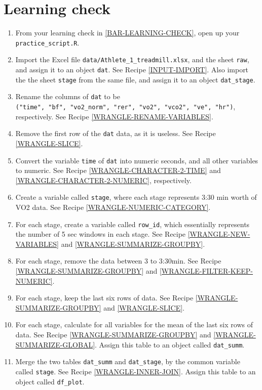 \documentclass[
]{book}
\begin{document}
\hypertarget{LINE-GRAPH-LEARNING-CHECK}{%
\section{Learning check}\label{LINE-GRAPH-LEARNING-CHECK}}

\begin{enumerate}
\def\labelenumi{\arabic{enumi}.}
\item
  From your learning check in \ref{BAR-LEARNING-CHECK}, open up your \texttt{practice\_script.R}.
\item
  Import the Excel file \texttt{data/Athlete\_1\_treadmill.xlsx}, and the sheet \texttt{raw}, and assign it to an object \texttt{dat}. See Recipe \ref{INPUT-IMPORT}. Also import the the sheet \texttt{stage} from the same file, and assign it to an object \texttt{dat\_stage}.
\item
  Rename the columns of \texttt{dat} to be \texttt{("time",\ "bf",\ "vo2\_norm",\ "rer",\ "vo2",\ "vco2",\ "ve",\ "hr")}, respectively. See Recipe \ref{WRANGLE-RENAME-VARIABLES}.
\item
  Remove the first row of the \texttt{dat} data, as it is useless. See Recipe \ref{WRANGLE-SLICE}.
\item
  Convert the variable \texttt{time} of \texttt{dat} into numeric seconds, and all other variables to numeric. See Recipe \ref{WRANGLE-CHARACTER-2-TIME} and \ref{WRANGLE-CHARACTER-2-NUMERIC}, respectively.
\item
  Create a variable called \texttt{stage}, where each stage represents 3:30 min worth of VO2 data. See Recipe \ref{WRANGLE-NUMERIC-CATEGORY}.
\item
  For each stage, create a variable called \texttt{row\_id}, which essentially represents the number of 5 sec windows in each stage. See Recipe \ref{WRANGLE-NEW-VARIABLES} and \ref{WRANGLE-SUMMARIZE-GROUPBY}.
\item
  For each stage, remove the data between 3 to 3:30min. See Recipe \ref{WRANGLE-SUMMARIZE-GROUPBY} and \ref{WRANGLE-FILTER-KEEP-NUMERIC}.
\item
  For each stage, keep the last six rows of data. See Recipe \ref{WRANGLE-SUMMARIZE-GROUPBY} and \ref{WRANGLE-SLICE}.
\item
  For each stage, calculate for all variables for the mean of the last six rows of data. See Recipe \ref{WRANGLE-SUMMARIZE-GROUPBY} and \ref{WRANGLE-SUMMARIZE-GLOBAL}. Assign this table to an object called \texttt{dat\_summ}.
\item
  Merge the two tables \texttt{dat\_summ} and \texttt{dat\_stage}, by the common variable called \texttt{stage}. See Recipe \ref{WRANGLE-INNER-JOIN}. Assign this table to an object called \texttt{df\_plot}.

\end{enumerate}
\end{document}
